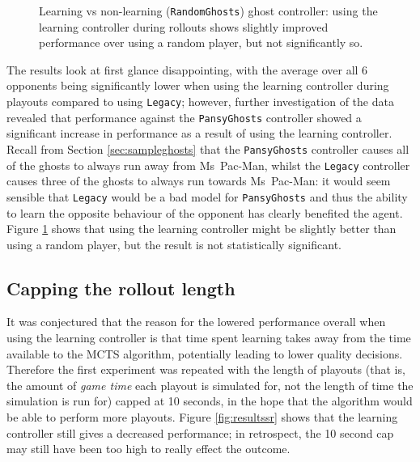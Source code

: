 \begin{figure}
\centering
{}
\caption[Learning vs non-learning ({\tt RandomGhosts}) ghost controller]{Learning vs non-learning ({\tt RandomGhosts}) ghost controller: using the learning controller during rollouts shows slightly improved performance over using a random player, but not significantly so.}
\label{fig:resultsrandom}
\end{figure}

The results look at first glance disappointing, with the average over all 6 opponents being significantly lower when using the learning controller during playouts compared to using {\tt Legacy}; however, further investigation of the data revealed that performance against the {\tt PansyGhosts} controller showed a significant increase in performance as a result of using the learning controller.  Recall from Section \ref{sec:sampleghosts} that the {\tt PansyGhosts} controller causes all of the ghosts to always run away from Ms~Pac-Man, whilst the {\tt Legacy} controller causes three of the ghosts to always run towards Ms~Pac-Man: it would seem sensible that {\tt Legacy} would be a bad model for {\tt PansyGhosts} and thus the ability to learn the opposite behaviour of the opponent has clearly benefited the agent.  Figure \ref{fig:resultsrandom} shows that using the learning controller might be slightly better than using a random player, but the result is not statistically significant.

\subsection{Capping the rollout length}

It was conjectured that the reason for the lowered performance overall when using the learning controller is that time spent learning takes away from the time available to the MCTS algorithm, potentially leading to lower quality decisions.  Therefore the first experiment was repeated with the length of playouts (that is, the amount of \emph{game time} each playout is simulated for, not the length of time the simulation is run for) capped at 10 seconds, in the hope that the algorithm would be able to perform more playouts.  Figure \ref{fig:resultssr} shows that the learning controller still gives a decreased performance; in retrospect, the 10 second cap may still have been too high to really effect the outcome.

